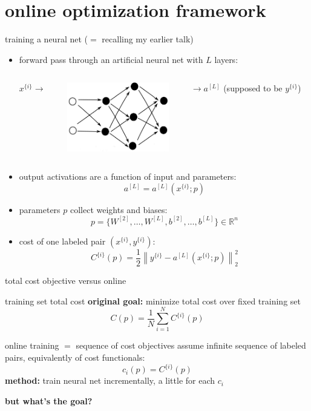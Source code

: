 \documentclass[xcolor={svgnames},
               hyperref={colorlinks,citecolor=DeepPink4,linkcolor=FireBrick,urlcolor=Maroon}]
               {beamer}
\newcommand{\RR}{\mathbb{R}}
\begin{document}
\section{online optimization framework}

\begin{frame}{training a neural net ($=$ recalling my earlier talk)}

\begin{itemize}
\item forward pass through an artificial neural net with $L$ layers:

\begin{columns}
\begin{column}{0.1\textwidth}
$x^{\{i\}}\to$ 
\end{column}
\begin{column}{0.4\textwidth}
\includegraphics[height=30mm]{figs/cleannet.png}
\end{column}
\begin{column}{0.45\textwidth}
$\to a^{[L]}$ \hfill (supposed to be $y^{\{i\}}$)
\end{column}
\end{columns}

\item output activations are a function of input and parameters:
    $$a^{[L]} = a^{[L]}(x^{\{i\}}; p)$$
\item parameters $p$ collect weights and biases:
    $$p=\{W^{[2]},\dots,W^{[L]},b^{[2]},\dots,b^{[L]}\} \in \RR^n$$
\item cost of one labeled pair $(x^{\{i\}},y^{\{i\}})$:
    $$C^{\{i\}}(p) = \frac{1}{2} \left\|y^{\{i\}} - a^{[L]}(x^{\{i\}}; p)\right\|_2^2$$
\end{itemize}
\end{frame}


\begin{frame}{total cost objective versus online}

\begin{block}{training set total cost}
\textbf{original goal:}  minimize total cost over fixed training set
    $$C(p) = \frac{1}{N} \sum_{i=1}^N C^{\{i\}}(p)$$
\end{block}

\begin{block}{online training $=$ sequence of cost objectives}
assume infinite sequence of labeled pairs, equivalently of cost functionals:
    $$c_i(p) = C^{\{i\}}(p)$$
\textbf{method:} train neural net incrementally, a little for each $c_i$

\bigskip
\textbf{but what's the goal?}
\end{block}
\end{frame}
\end{document}
